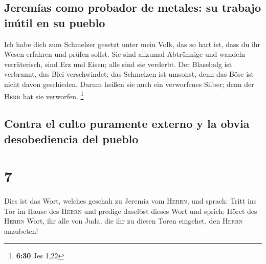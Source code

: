 \hypertarget{jeremuxedas-como-probador-de-metales-su-trabajo-inuxfatil-en-su-pueblo}{%
\subsection{Jeremías como probador de metales: su trabajo inútil en su
pueblo}\label{jeremuxedas-como-probador-de-metales-su-trabajo-inuxfatil-en-su-pueblo}}

 Ich habe dich zum Schmelzer gesetzt unter mein Volk, das
so hart ist, dass du ihr Wesen erfahren und prüfen sollst.
 Sie sind allzumal Abtrünnige und wandeln verräterisch,
sind Erz und Eisen; alle sind sie verderbt.  Der
Blasebalg ist verbrannt, das Blei verschwindet; das Schmelzen ist
umsonst, denn das Böse ist nicht davon geschieden.  Darum
heißen sie auch ein verworfenes Silber; denn der \textsc{Herr} hat sie
verworfen. \footnote{\textbf{6:30} Jes 1,22}

\hypertarget{contra-el-culto-puramente-externo-y-la-obvia-desobediencia-del-pueblo}{%
\subsection{Contra el culto puramente externo y la obvia desobediencia
del
pueblo}\label{contra-el-culto-puramente-externo-y-la-obvia-desobediencia-del-pueblo}}

\hypertarget{section-6}{%
\section{7}\label{section-6}}

 Dies ist das Wort, welches geschah zu Jeremia vom
\textsc{Herrn}, und sprach:  Tritt ins Tor im Hause des
\textsc{Herrn} und predige daselbst dieses Wort und sprich: Höret des
\textsc{Herrn} Wort, ihr alle von Juda, die ihr zu diesen Toren
eingehet, den \textsc{Herrn} anzubeten!

